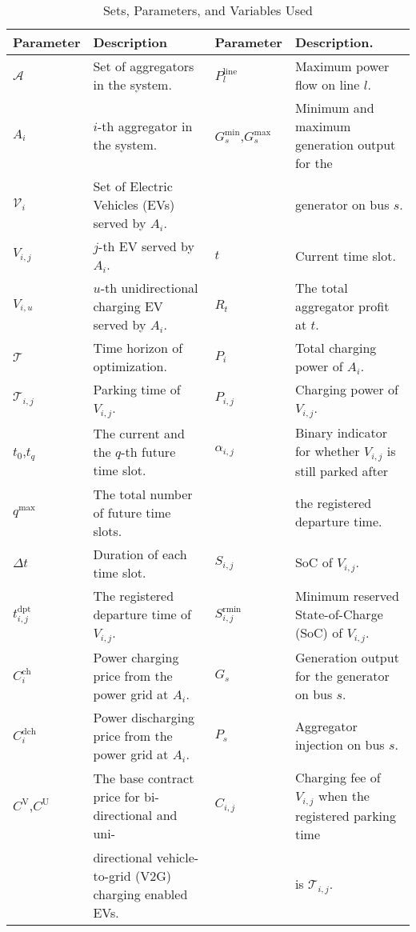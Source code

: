 \documentclass[conference]{IEEEtran}
\begin{document}
	\begin{table*}
		\caption{Sets, Parameters, and Variables Used}
		\centering
		\label{tbl:nomenclature}
		\begin{tabular}{l|l||l|l}
			\hline
			Parameter & Description & Parameter & Description. \\
			\hline
			$\mathcal{A}$ & Set of aggregators in the system. & $P^\text{line}_l$ & Maximum power flow on line $l$. \\
			$A_i$ & $i$-th aggregator in the system. & $G^\text{min}_{s}$,$G^\text{max}_{s}$ & Minimum and maximum generation output for the \\
			$\mathcal{V}_i$ & Set of Electric Vehicles (EVs) served by $A_i$. & & generator on bus $s$. \\
			$V_{i,j}$ & $j$-th EV served by $A_i$. & $t$ & Current time slot. \\
			$V_{i,u}$ & $u$-th unidirectional charging EV served by $A_i$. & $R_t$ & The total aggregator profit at $t$. \\
			$\mathcal{T}$ & Time horizon of optimization. & $P_i$ & Total charging power of $A_i$. \\
			$\mathcal{T}_{i,j}$ & Parking time of $V_{i,j}$. & $P_{i,j}$ & Charging power of $V_{i,j}$. \\
			$t_0$,$t_q$ & The current and the $q$-th future time slot. & $\alpha_{i,j}$ & Binary indicator for whether $V_{i,j}$ is still parked after \\
			$q^\text{max}$ & The total number of future time slots. & & the registered departure time. \\
			$\Delta t$ & Duration of each time slot. & $S_{i,j}$ & SoC of $V_{i,j}$. \\
			$t^\text{dpt}_{i,j}$ & The registered departure time of $V_{i,j}$. & $S^\text{rmin}_{i,j}$ & Minimum reserved State-of-Charge (SoC) of $V_{i,j}$. \\
			$C_i^\text{ch}$ & Power charging price from the power grid at $A_i$. & $G_s$ & Generation output for the generator on bus $s$. \\
			$C_i^\text{dch}$ & Power discharging price from the power grid at $A_i$. & $P_s$ & Aggregator injection on bus $s$. \\
			$C^\text{V}$,$C^\text{U}$ & The base contract price for bi-directional and uni- & $C_{i,j}$ & Charging fee of $V_{i,j}$ when the registered parking time \\
			& directional vehicle-to-grid (V2G) charging enabled EVs. & & is $\mathcal{T}_{i,j}$. \\

\end{tabular}
\end{table*}
\end{document}

